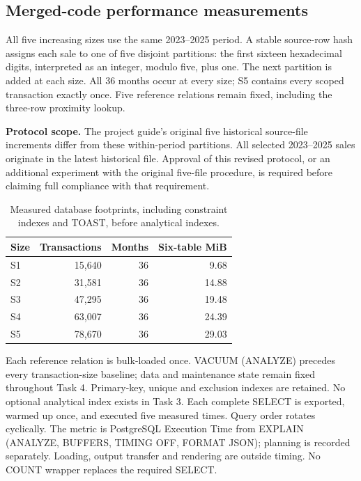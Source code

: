 \subsection{Merged-code performance measurements}
All five increasing sizes use the same 2023--2025 period. A stable source-row hash assigns each sale to one of five disjoint partitions: the first sixteen hexadecimal digits, interpreted as an integer, modulo five, plus one. The next partition is added at each size. All 36 months occur at every size; S5 contains every scoped transaction exactly once. Five reference relations remain fixed, including the three-row proximity lookup.

\textbf{Protocol scope.} The project guide's original five historical source-file increments differ from these within-period partitions. All selected 2023--2025 sales originate in the latest historical file. Approval of this revised protocol, or an additional experiment with the original five-file procedure, is required before claiming full compliance with that requirement.

\begin{table}[H]\centering\small
\begin{tabular}{lrrr}
\toprule
Size & Transactions & Months & Six-table MiB \\
\midrule
S1 & 15,640 & 36 & 9.68 \\
S2 & 31,581 & 36 & 14.88 \\
S3 & 47,295 & 36 & 19.48 \\
S4 & 63,007 & 36 & 24.39 \\
S5 & 78,670 & 36 & 29.03 \\
\bottomrule
\end{tabular}
\caption{Measured database footprints, including constraint indexes and TOAST, before analytical indexes.}
\end{table}

Each reference relation is bulk-loaded once. VACUUM (ANALYZE) precedes every transaction-size baseline; data and maintenance state remain fixed throughout Task 4. Primary-key, unique and exclusion indexes are retained. No optional analytical index exists in Task 3. Each complete SELECT is exported, warmed up once, and executed five measured times. Query order rotates cyclically. The metric is PostgreSQL Execution Time from EXPLAIN (ANALYZE, BUFFERS, TIMING OFF, FORMAT JSON); planning is recorded separately. Loading, output transfer and rendering are outside timing. No COUNT wrapper replaces the required SELECT.

